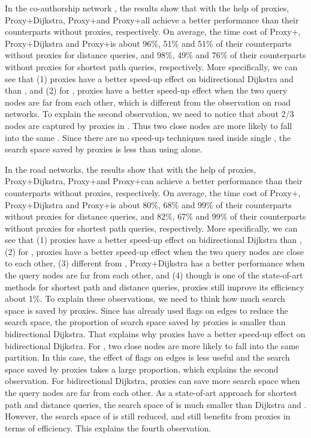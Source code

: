 In the co-authorship network \dblpone, the results show that with the help of proxies, Proxy+Dijkstra, Proxy+\arcflag and Proxy+\tnr all achieve a better performance than their counterparts without proxies, respectively. On average, the time cost of Proxy+\arcflag, Proxy+Dijkstra and Proxy+\tnr is about 96\%, 51\% and 51\% of their counterparts without proxies for distance queries, and 98\%, 49\% and 76\% of their counterparts without proxies for shortest path queries, respectively. More specifically, we can see that (1) proxies have a better speed-up effect on bidirectional Dijkstra and \tnr than \arcflag, and (2) for \arcflag, proxies have a better speed-up effect when the two query nodes are far from each other, which is different from the observation on road networks. To explain the second observation, we need to notice that about 2/3 nodes are captured by proxies in \dblpone. Thus two close nodes are more likely to fall into the same \dras. Since there are no speed-up techniques used inside single \dras, the search space saved by proxies is less than using \arcflag alone.

In the road networks, the results show that with the help of proxies, Proxy+Dijkstra, Proxy+\arcflag  and Proxy+\ah can achieve a better performance than their counterparts without proxies, respectively. On average, the time cost of Proxy+\arcflag, Proxy+Dijkstra and Proxy+\ah is about 80\%, 68\% and 99\% of their counterparts without proxies for distance queries, and 82\%, 67\% and 99\% of their counterparts without proxies for shortest path queries, respectively. More specifically, we can see that (1) proxies have a better speed-up effect on bidirectional Dijkstra than \arcflag, (2) for \arcflag, proxies have a better speed-up effect when the two query nodes are close to each other, (3) different from \arcflag, Proxy+Dijkstra has a better performance when the query nodes are far from each other, and (4) though \ah is one of the state-of-art methods for shortest path and distance queries, proxies still improve its efficiency about 1\%. To explain these observations, we need to think how much search space is saved by proxies. Since \arcflag has already used flags on edges to reduce the search space, the proportion of search space saved by proxies is smaller than bidirectional Dijkstra. That explains why proxies have a better speed-up effect on bidirectional Dijkstra. For \arcflag, two close nodes are more likely to fall into the same partition. In this case, the effect of flags on edges is less useful and the search space saved by proxies takes a large proportion, which explains the second observation. For bidirectional Dijkstra, proxies can save more search space when the query nodes are far from each other. As a state-of-art approach for shortest path and distance queries, the search space of \ah is much smaller than Dijkstra and \arcflag. However, the search space of \ah is still reduced, and \ah still benefits from proxies in terms of efficiency. This explains the fourth observation.

